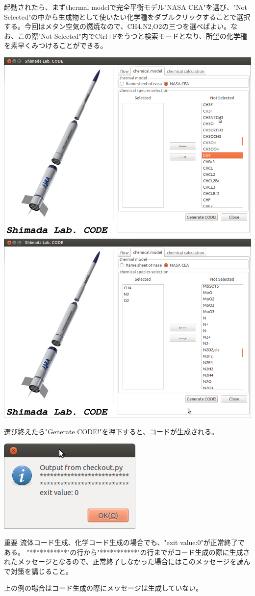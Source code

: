\documentclass{jsarticle}
\begin{document}
起動されたら、まずthermal modelで完全平衡モデル"NASA CEA"を選び、"Not Selected"の中から生成物として使いたい化学種をダブルクリックすることで選択する。今回はメタン空気の燃焼なので、CH4,N2,O2の三つを選べばよい。なお、この際"Not Selected"内でCtrl+Fをうつと検索モードとなり、所望の化学種を素早くみつけることができる。
\begin{center}
\includegraphics[width=.7\textwidth,bb=0 0 895 649]{tutorial_img/030.png}
\includegraphics[width=.7\textwidth,bb=0 0 895 649]{tutorial_img/035.png}
\end{center}
選び終えたら"Generate CODE!"を押下すると、コードが生成される。
\begin{center}
\includegraphics[width=.3\textwidth,bb=0 0 268 174]{tutorial_img/040.png}
\end{center}
\begin{itembox}[l]{重要}
流体コード生成、化学コード生成の場合でも、"exit value:0"が正常終了である。
"***********"の行から"***********"の行までがコード生成の際に生成されたメッセージとなるので、正常終了しなかった場合にはこのメッセージを読んで対策を講じること。
\end{itembox}
上の例の場合はコード生成の際にメッセージは生成していない。
\end{document}

